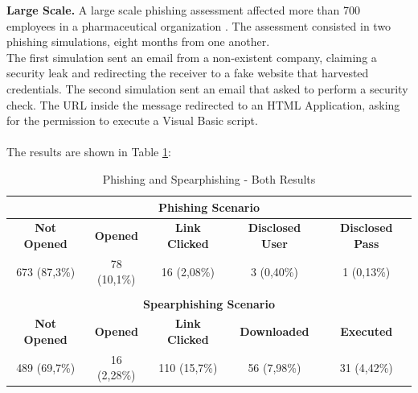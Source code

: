 \documentclass[a4paper]{article}
\begin{document}
\noindent
\textbf{Large Scale.} A large scale phishing assessment affected more than 700 employees in a pharmaceutical organization \cite{lit-casestudy-assessing-resilience}. The assessment consisted in two phishing simulations, eight months from one another.
\\
The first simulation sent an email from a non-existent company, claiming a security leak and redirecting the receiver to a fake website that harvested credentials. The second simulation sent an email that asked to perform a security check. The URL inside the message redirected to an HTML Application, asking for the permission to execute a Visual Basic script. 
\\ \\
The results are shown in Table \ref{tb-lit5}:

\smallskip

\begingroup
\renewcommand{\arraystretch}{1.25}
\begin{table}[ht]
\begin{center}
    \begin{tabular}{ | c | c | c | c | c | }
    \hline
    
    \multicolumn{5}{|c|}{\textbf{Phishing Scenario}} \\ \hline
    
    \textbf{Not Opened} & \textbf{Opened} & \textbf{Link Clicked} & \textbf{Disclosed User} & \textbf{Disclosed Pass}\\ \hline
    673 (87,3\%) & 78 (10,1\%) & 16 (2,08\%) & 3 (0,40\%) & 1 (0,13\%) \\ \hline
    
    \multicolumn{5}{l}{} \\ \hline
    
    \multicolumn{5}{|c|}{\textbf{Spearphishing Scenario}} \\ \hline
    
    \textbf{Not Opened} & \textbf{Opened} & \textbf{Link Clicked} & \textbf{Downloaded} & \textbf{Executed}\\ \hline
    489 (69,7\%) & 16 (2,28\%) & 110 (15,7\%) & 56 (7,98\%) & 31 (4,42\%) \\ \hline
    \end{tabular}
\end{center}
\caption{Phishing and Spearphishing - Both Results \cite{lit-casestudy-assessing-resilience}}
\label{tb-lit5}
\end{table}
\endgroup
\end{document}
